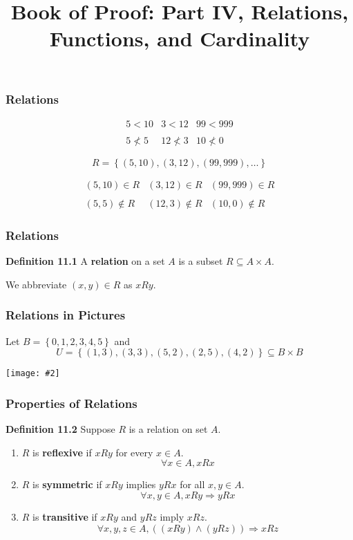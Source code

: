 \documentclass{beamer}
\title{Book of Proof: Part IV, Relations, Functions, and Cardinality}
\newcommand{\set}[1]{\ensuremath{\left\{ #1 \right\}}}
\newcommand{\then}{\ensuremath{\Rightarrow}}
\newcommand{\grf}[2]{\centerline{\texttt{[image: \#2]}}}
\newcommand{\bfr}[1]{\begin{frame}[fragile]\frametitle{{ #1 }}}
\begin{document}
\begin{frame}
\maketitle

\end{frame}

\bfr{Relations}
\[
\begin{array}{ccc}
  5 < 10 & 3 < 12 & 99 < 999 \\\\
  5 \not< 5 & 12\not< 3 & 10 \not< 0
\end{array}
\]

\pause\vfill
\[ R = \set{(5,10), (3,12), (99,999), \ldots} \]

\[
\begin{array}{ccc}
  (5,10)\in R & (3,12)\in R & (99,999)\in R \\\\
  (5,5) \not\in R & (12,3) \not\in R & (10,0)\not\in R
\end{array}
\]


\end{frame}

\bfr{Relations}

{\bf Definition 11.1}  A {\bf relation} on a set $A$ is a subset
$R\subseteq A\times A$.

We abbreviate $(x,y)\in R$ as $xRy$.

\end{frame}


\bfr{Relations in Pictures}

Let $B=\set{0,1,2,3,4,5}$ and
\[ U = \set{
  (1,3), (3,3), (5,2), (2,5), (4,2)
} \subseteq B\times B
\]

\grf{0.5}{relationUonB.png}

\end{frame}

\bfr{Properties of Relations}

{\bf Definition 11.2}  Suppose $R$ is a relation on set $A$.

\begin{enumerate}
\item  $R$ is {\bf reflexive} if $xRy$ for every $x\in A$.
  \[ \forall x\in A, xRx \]

\item $R$ is {\bf symmetric} if $xRy$ implies $yRx$ for all
  $x,y\in A$.
  \[ \forall x,y \in A, xRy \then yRx \]

\item $R$ is {\bf transitive} if $xRy$ and $yRz$ imply $xRz$.
  \[
  \forall x,y,z\in A, ((xRy) \land (yRz)) \then xRz
  \]
\end{enumerate}
\end{frame}
\end{document}
